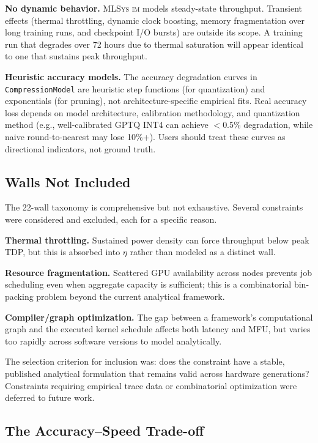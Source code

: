\documentclass[10pt,twocolumn]{article}
\newcommand{\mlsysim}{\mbox{\textsc{MLSys}\,\textperiodcentered\,\textsc{im}}\xspace}
\begin{document}
\textbf{No dynamic behavior.} \mlsysim models steady-state throughput. Transient effects (thermal throttling, dynamic clock boosting, memory fragmentation over long training runs, and checkpoint I/O bursts) are outside its scope. A training run that degrades over 72 hours due to thermal saturation will appear identical to one that sustains peak throughput.

\textbf{Heuristic accuracy models.} The accuracy degradation curves in \texttt{CompressionModel} are heuristic step functions (for quantization) and exponentials (for pruning), not architecture-specific empirical fits. Real accuracy loss depends on model architecture, calibration methodology, and quantization method (e.g., well-calibrated GPTQ INT4 can achieve $<$0.5\% degradation, while naive round-to-nearest may lose 10\%+). Users should treat these curves as directional indicators, not ground truth.

\subsection{Walls Not Included}

The 22-wall taxonomy is comprehensive but not exhaustive. Several constraints were considered and excluded, each for a specific reason.

\textbf{Thermal throttling.} Sustained power density can force throughput below peak TDP, but this is absorbed into $\eta$ rather than modeled as a distinct wall.

\textbf{Resource fragmentation.} Scattered GPU availability across nodes prevents job scheduling even when aggregate capacity is sufficient; this is a combinatorial bin-packing problem beyond the current analytical framework.

\textbf{Compiler/graph optimization.} The gap between a framework's computational graph and the executed kernel schedule affects both latency and MFU, but varies too rapidly across software versions to model analytically.

The selection criterion for inclusion was: does the constraint have a stable, published analytical formulation that remains valid across hardware generations? Constraints requiring empirical trace data or combinatorial optimization were deferred to future work.

\subsection{The Accuracy--Speed Trade-off}
\end{document}
